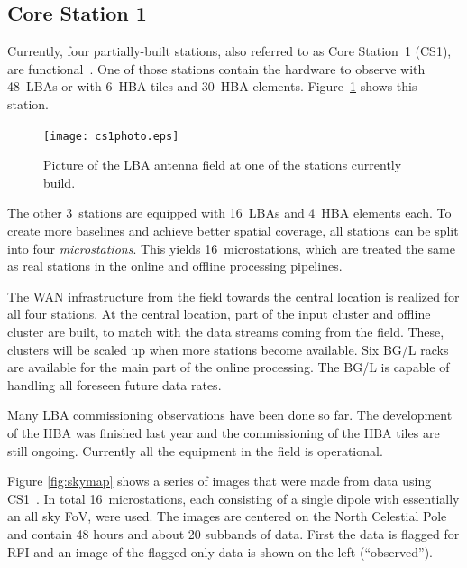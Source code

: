 \documentclass[journal]{IEEEtran}
\begin{document}
\subsection{Core Station 1}
Currently, four partially-built stations, also referred to as Core Station~1
(CS1), are functional~\cite{gunst:06}.
One of those stations contain the hardware to observe with 48~LBAs or with
6~HBA tiles and 30~HBA elements. Figure~\ref{fig:cs1} shows this station.

\begin{figure}
\begin{center}
\texttt{[image: cs1photo.eps]}
\end{center}
\caption{Picture of the LBA antenna field at one of the stations currently build.}
\label{fig:cs1}
\end{figure}

The other 3~stations are equipped with 16~LBAs and 4~HBA elements each.
To create more baselines and achieve better spatial coverage, all stations
can be split into four {\em microstations}.
This yields 16~microstations, which are treated the same as real stations in
the online and offline processing pipelines.


The WAN infrastructure from the field towards the central location is realized for all four stations. At the central location, part of the input cluster and offline cluster are built, to match with the data streams coming from the field. These, clusters will be scaled up when more stations become available. Six BG/L racks are available for the main part of the online processing. The BG/L is capable of handling all foreseen future data rates.

Many LBA commissioning observations have been done so far. The development of the HBA was finished last year and the commissioning of the HBA tiles are still ongoing. Currently all the equipment in the field is operational.

Figure \ref{fig:skymap} shows a series of images that were made from data using CS1~\cite{Yatawatta:08}. In total 16~microstations, each consisting of a single dipole with essentially an all sky FoV, were used. The images are centered on the North Celestial Pole and contain 48 hours and about 20 subbands of data. First the data is flagged for RFI and an image of the flagged-only data is shown on the left (``observed''). 
\end{document}
